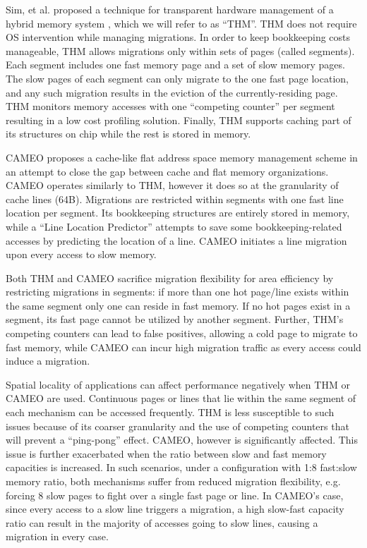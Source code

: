Sim, et al. proposed a technique for transparent hardware management of a hybrid memory system \cite{sim-micro2014}, which we will refer to as ``THM''.
THM does not require OS intervention while managing migrations. In order to keep bookkeeping costs manageable, THM allows migrations only within sets of pages (called segments). Each segment includes one fast memory page and a set of slow memory pages. The slow pages of each segment can only migrate to the one fast page location, and any such migration results in the eviction of the currently-residing page. THM monitors memory accesses with one ``competing counter'' per segment resulting in a low cost profiling solution. Finally, THM supports caching part of its structures on chip while the rest is stored in memory.

CAMEO \cite{cameo} proposes a cache-like flat address space memory management scheme in an attempt to close the gap between cache and flat memory organizations. CAMEO operates similarly to THM, however it does so at the granularity of cache lines (64B). Migrations are restricted within segments with one fast line location per segment. Its bookkeeping structures are entirely stored in memory, while a ``Line Location Predictor'' attempts to save some bookkeeping-related accesses by predicting the location of a line. CAMEO initiates a line migration upon every access to slow memory.

Both THM and CAMEO sacrifice migration flexibility for area efficiency by restricting migrations in segments: if more than one hot page/line exists within the same segment only one can reside in fast memory. If no hot pages exist in a segment, its fast page cannot be utilized by another segment. Further, THM's competing counters can lead to false positives, allowing a cold page to migrate to fast memory, while CAMEO can incur high migration traffic as every access could induce a migration. 

Spatial locality of applications can affect performance negatively when THM or CAMEO are used. Continuous pages or lines that lie within the same segment of each mechanism can be accessed frequently. THM is less susceptible to such issues because of its coarser granularity and the use of competing counters that will prevent a ``ping-pong'' effect. CAMEO, however is significantly affected. This issue is further exacerbated when the ratio between slow and fast memory capacities is increased. In such scenarios, under a configuration with 1:8 fast:slow memory ratio, both mechanisms suffer from reduced migration flexibility,
e.g. forcing 8 slow pages to fight over a single fast page or
line.  In CAMEO's case, since every access to a slow line triggers a migration,
a high slow-fast capacity ratio can result in the majority of accesses going
to slow lines, causing a migration in every case.

